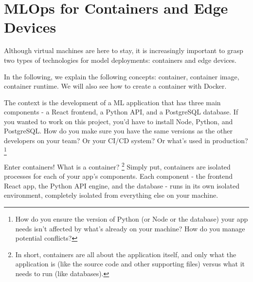 \section{MLOps for Containers and Edge Devices}
Although virtual machines are here to stay, it is increasingly
important to grasp two types of technologies for model
deployments: containers and edge devices.

In the following, we explain the following concepts:
container, container image, container runtime. We will
also see how to create a container with Docker.















The context is the development of a ML application that has
three main components - a React frontend, a Python API, and a
PostgreSQL database. If you wanted to work on this project,
you'd have to install Node, Python, and PostgreSQL.
How do you make sure you have the same versions as the other
developers on your team? Or your CI/CD system? Or what's
used in production?
\footnote{
    How do you ensure the version of Python
    (or Node or the database) your app needs isn't affected
    by what's already on your machine? How do you manage
    potential conflicts?
}

Enter containers! What is a container?
\footnote{
    In short, containers are all about the application itself,
    and only what the application is (like the source code
    and other supporting files) versus what it needs to run
    (like databases).
}
Simply put, containers
are isolated processes for each of your app's components.
Each component - the frontend React app, the Python API engine,
and the database - runs in its own isolated environment,
completely isolated from everything else on your machine.

